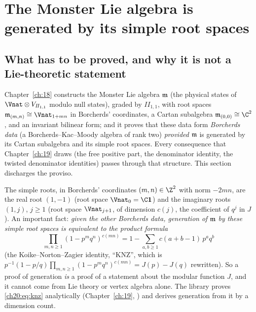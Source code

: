 \section{The Monster Lie algebra is generated by its simple root spaces}\label{ch20:sec:generation}

\subsection{What has to be proved, and why it is not a Lie-theoretic statement}

Chapter~\ref{ch:18} constructs the Monster Lie algebra $\mathfrak m$ (the physical states of $\Vnat\otimes V_{I\!I_{1,1}}$
modulo null states), graded by $I\!I_{1,1}$, with root spaces $\chtwentym_{(m,n)}\cong\Vnat_{1+mn}$ in Borcherds' coordinates,
a Cartan subalgebra $\chtwentym_{(0,0)}\cong\C^2$, and an invariant bilinear form; and it proves that these data form
\emph{Borcherds data} (a Borcherds--Kac--Moody algebra of rank two) \emph{provided} $\mathfrak m$ is generated by its Cartan
subalgebra and its simple root spaces.  Every consequence that Chapter~\ref{ch:19} draws (the free positive part, the
denominator identity, the twisted denominator identities) passes through that structure.  This section discharges the
proviso.

The simple roots, in Borcherds' coordinates $(m,n)\in\Z^2$ with norm $-2mn$, are the real root $(1,-1)$ (root space
$\Vnat_0=\C\chtwentyvac$) and the imaginary roots $(1,j)$, $j\ge1$ (root space $\Vnat_{j+1}$, of dimension $c(j)$, the
coefficient of $q^j$ in $J$).  An important fact: \emph{given
the other Borcherds data, generation of $\mathfrak m$ by these simple root spaces is equivalent to the product formula}
\begin{equation}\label{ch20:eq:knz}
  \prod_{m,n\ge1}(1-p^mq^n)^{c(mn)}=1-\sum_{a,b\ge1}c(a+b-1)\,p^aq^b
\end{equation}
(the Koike--Norton--Zagier identity, ``KNZ'', which is $p^{-1}(1-p/q)\prod_{m,n\ge1}(1-p^mq^n)^{c(mn)}=J(p)-J(q)$
rewritten).  So a proof of generation \emph{is} a proof of a statement about the modular function $J$, and it cannot come
from Lie theory or vertex algebra alone.  The library proves \eqref{ch20:eq:knz} analytically (Chapter~\ref{ch:19},
) and derives generation from it by a dimension count.

